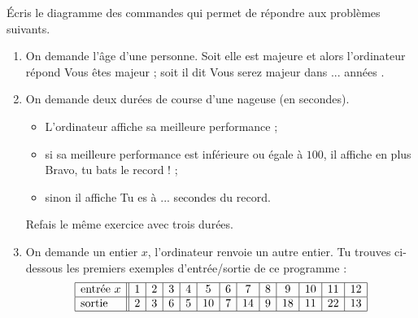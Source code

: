 \documentclass[class=report,crop=false, 12pt]{standalone}
\begin{document}
\begin{activite}
Écris le diagramme des commandes qui permet de répondre aux problèmes suivants.
\begin{enumerate}
  \item On demande l'âge d'une personne. Soit elle est majeure et alors l'ordinateur répond \og Vous êtes majeur \fg{} ;
  soit il dit \og Vous serez majeur dans ... années \fg{}. 
  
  \item On demande deux durées de course d'une nageuse (en secondes). 
  \begin{itemize}
    \item L'ordinateur affiche sa meilleure performance ;
    
    \item si sa meilleure performance est inférieure ou égale à $100$, il affiche en plus \og Bravo, tu bats le record ! \fg{} ;
    
    \item sinon il affiche \og Tu es à ... secondes du record\fg{}.
  \end{itemize}
  
  Refais le même exercice avec trois durées.
  
  \item On demande un entier $x$, l'ordinateur renvoie un autre entier. Tu trouves ci-dessous les premiers exemples d'entrée/sortie de ce programme : 
  $$\begin{array}{|l||c|c|c|c|c|c|c|c|c|c|c|c|c|c|}
  \hline
  \text{entrée } x & 1&2&3&4&5&6&7&8&9&10&11&12\\
  \hline
  \text{sortie } & 2&3&6&5&10&7&14&9&18&11&22&13\\
  \hline
  \end{array}  
  $$
  
\end{enumerate}
\end{activite}
\end{document}
